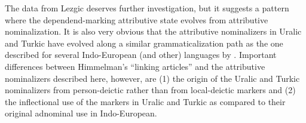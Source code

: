 {
The data from Lezgic deserves further investigation, but it suggests a pattern where the dependend-marking attributive state evolves from attributive nominalization. It is also very obvious that the attributive nominalizers in Uralic and Turkic have evolved along a similar grammaticalization path as the one described for several Indo-European (and other) languages by \cite{himmelmann1997}. Important differences between Himmelman's “linking articles”  and the attributive nominalizers described here, however, are (1) the origin of the Uralic and Turkic nominalizers from person-deictic rather than from local-deictic markers and (2) the inflectional use of the markers in Uralic and Turkic as compared to their original adnominal use in Indo-European.

}
